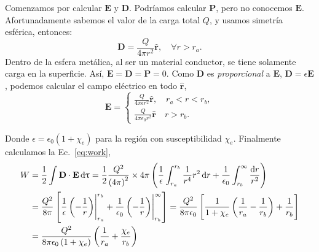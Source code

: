\documentclass[
  11pt,
  letterpaper,
   answers
  ]{exam}
\begin{document}
\begin{questions}
  \begin{solution}
    Comenzamos por calcular $\mathbf{E}$ y $\mathbf{D}$. Podríamos calcular $\mathbf{P}$, pero no conocemos $\mathbf{E}$. Afortunadamente sabemos el valor de la carga total $Q$, y usamos simetría esférica, entonces:
    \begin{equation}
      \mathbf{D} = \frac{Q}{4\pi r^2}\widehat{\mathbf{r}}, \quad\forall r>r_a.
    \end{equation}
    Dentro de la esfera metálica, al ser un material conductor, se tiene solamente carga en la superficie. Así, $\mathbf{E}=\mathbf{D}=\mathbf{P}=0$. Como $\mathbf{D}$ es \textit{proporcional} a $\mathbf{E}$, $\mathbf{D} = \epsilon\mathbf{E}$, podemos calcular el campo eléctrico en todo $\widehat{\mathbf{r}}$,
    \begin{equation}
      \mathbf{E} = \begin{cases}
        \frac{Q}{4\pi\epsilon r^2}\widehat{\mathbf{r}}, \quad r_a<r<r_b, \\
        \frac{Q}{4\pi\epsilon_0 r^2}\widehat{\mathbf{r}} \quad r>r_b.
      \end{cases}

    \end{equation}

    Donde $\epsilon   = \epsilon_0 (1+\chi_e)$ para la región con susceptibilidad $\chi_e$. Finalmente calculamos la Ec.~\eqref{eq:work},
    \begin{align}
      W &= \frac{1}{2}\int\mathbf{D}\cdot\mathbf{E}\dif\uptau = \frac{1}{2}\frac{Q^2}{\del{4\pi}^2}\times4\pi \del{ \frac{1}{\epsilon}\int_{r_a}^{r_b} \frac{1}{r^4}r^2\dif{r} + \frac{1}{\epsilon_0}\int_{r_b}^\infty \frac{\dif{r}}{r^2} } \\
      &= \frac{Q^2}{8\pi} \sbr{ \frac{1}{\epsilon}\eval{\del{-\frac{1}{r}}}^{r_b}_{r_a} + \frac{1}{\epsilon_0}\eval{\del{-\frac{1}{r}}}_{r_b}^\infty} = \frac{Q^2}{8\pi\epsilon_0}\sbr{\frac{1}{1+\chi_e}\del{\frac{1}{r_a} - \frac{1}{r_b}}+\frac{1}{r_b}} \\
      &= \frac{Q^2}{8\pi\epsilon_0\del{1+\chi_e}} \del{\frac{1}{r_a} + \frac{\chi_e}{r_b}}
    \end{align}
  \end{solution}
\end{questions}
\end{document}
